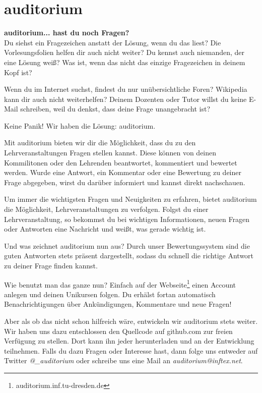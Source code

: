 \section{auditorium}


\textbf{auditorium... hast du noch Fragen?} \\
Du siehst ein Fragezeichen anstatt der Lösung, wenn du das liest?
Die Vorlesungsfolien helfen dir auch nicht weiter? Du kennst auch niemanden, der eine Lösung weiß?
Was ist, wenn das nicht das einzige Fragezeichen in deinem Kopf ist?

Wenn du im Internet suchst, findest du nur unübersichtliche Foren?
Wikipedia kann dir auch nicht weiterhelfen?
Deinem Dozenten oder Tutor willst du keine E-Mail schreiben, weil du denkst, dass deine Frage unangebracht ist?

Keine Panik!
Wir haben die Lösung: auditorium.

Mit auditorium bieten wir dir die Möglichkeit, dass du zu den Lehrveranstaltungen Fragen stellen kannst.
Diese können von deinen Kommilitonen oder den Lehrenden beantwortet, kommentiert und bewertet werden.
Wurde eine Antwort, ein Kommentar oder eine Bewertung zu deiner Frage abgegeben, wirst du darüber informiert und kannst direkt nachschauen.

Um immer die wichtigsten Fragen und Neuigkeiten zu erfahren, bietet auditorium die Möglichkeit, Lehrveranstaltungen zu verfolgen.
Folgst du einer Lehrveranstaltung, so bekommst du bei wichtigen Informationen, neuen Fragen oder Antworten eine Nachricht und weißt, was gerade wichtig ist.

Und was zeichnet auditorium nun aus?
Durch unser Bewertungssystem sind die guten Antworten stets präsent dargestellt, sodass du schnell die richtige Antwort zu deiner Frage finden kannst.

Wie benutzt man das ganze nun?
Einfach auf der Webseite\footnote{auditorium.inf.tu-dresden.de} einen Account anlegen und deinen Unikursen folgen.
Du erhälst fortan automatisch Benachrichtigungen über Ankündigungen, Kommentare und neue Fragen!

Aber als ob das nicht schon hilfreich wäre, entwickeln wir auditorium stets weiter.
Wir haben uns dazu entschlossen den Quellcode auf github.com zur freien Verfügung zu stellen.
Dort kann ihn jeder herunterladen und an der Entwicklung teilnehmen.
Falls du dazu Fragen oder Interesse hast, dann folge uns entweder auf Twitter \textit{@_auditorium} oder schreibe uns eine Mail an \textit{auditorium@inftex.net}.

